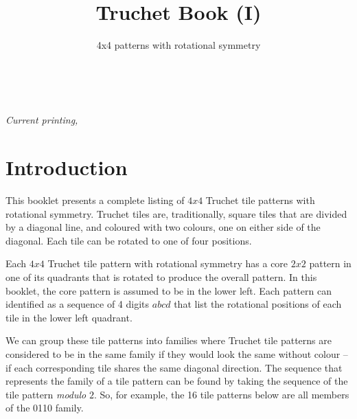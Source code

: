 \documentclass{tufte-book}
\title{Truchet Book (I)}
\subtitle{4x4 patterns with rotational symmetry}
\author[]{}
\begin{document}



\maketitle


\newpage
\begin{fullwidth}
~\vfill
\thispagestyle{empty}
\setlength{\parindent}{0pt}
\setlength{\parskip}{\baselineskip}



\par\textit{Current printing, \monthyear}
\end{fullwidth}




\cleardoublepage



\chapter*{Introduction}

This booklet presents a complete listing of $4x4$ Truchet tile patterns with rotational symmetry.  \marginnote{\centering} Truchet tiles are, traditionally, square tiles that are divided by a diagonal line, and coloured with two colours, one on either side of the diagonal. Each tile can be rotated to one of four positions.

\vspace{0.5cm}
\noindent
Each $4x4$
Truchet tile pattern with rotational symmetry has a core $2x2$ pattern in one of its quadrants that is rotated to produce the overall pattern. \marginnote{\centering} In this booklet, the core pattern is assumed to be in the lower left. Each pattern can identified as a sequence of 4 digits $abcd$ that list the rotational positions of each tile in the lower left quadrant.


\vspace{0.5cm}
\noindent
We can group these tile patterns into families where Truchet tile patterns are considered to be in the same family if they would look the same without colour -- if each corresponding tile shares the same diagonal direction. The sequence that represents the family of a tile pattern can be found by taking the sequence of the tile pattern \textit{modulo} $2$. So, for example, the 16 tile patterns below are all members of the 0110 family. 
\end{document}
